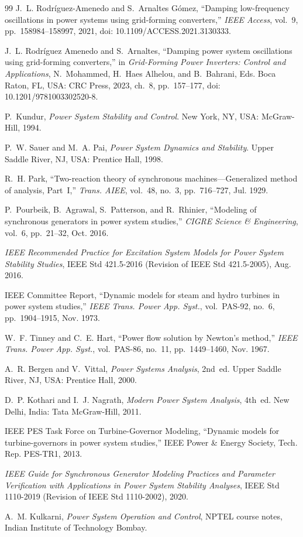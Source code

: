 \documentclass[11pt,a4paper]{article}
\numberwithin{equation}{section}
\begin{document}
\newpage
\begin{thebibliography}{99}
J.~L. Rodr\'iguez-Amenedo and S.~Arnaltes G\'omez, ``Damping low-frequency oscillations in power systems using grid-forming converters,'' \emph{IEEE Access}, vol.~9, pp.~158984--158997, 2021, doi: 10.1109/ACCESS.2021.3130333.

J.~L. Rodr\'iguez Amenedo and S.~Arnaltes, ``Damping power system oscillations using grid-forming converters,'' in \emph{Grid-Forming Power Inverters: Control and Applications}, N.~Mohammed, H.~Haes Alhelou, and B.~Bahrani, Eds. Boca Raton, FL, USA: CRC Press, 2023, ch.~8, pp.~157--177, doi: 10.1201/9781003302520-8.

P.~Kundur, \emph{Power System Stability and Control}. New York, NY, USA: McGraw-Hill, 1994.

P.~W. Sauer and M.~A. Pai, \emph{Power System Dynamics and Stability}. Upper Saddle River, NJ, USA: Prentice Hall, 1998.

R.~H. Park, ``Two-reaction theory of synchronous machines---Generalized method of analysis, Part~I,'' \emph{Trans. AIEE}, vol.~48, no.~3, pp.~716--727, Jul. 1929.

P.~Pourbeik, B.~Agrawal, S.~Patterson, and R.~Rhinier, ``Modeling of synchronous generators in power system studies,'' \emph{CIGRE Science \& Engineering}, vol.~6, pp.~21--32, Oct. 2016.

\emph{IEEE Recommended Practice for Excitation System Models for Power System Stability Studies}, IEEE Std 421.5-2016 (Revision of IEEE Std 421.5-2005), Aug. 2016.

IEEE Committee Report, ``Dynamic models for steam and hydro turbines in power system studies,'' \emph{IEEE Trans. Power App. Syst.}, vol.~PAS-92, no.~6, pp.~1904--1915, Nov. 1973.

W.~F. Tinney and C.~E. Hart, ``Power flow solution by Newton's method,'' \emph{IEEE Trans. Power App. Syst.}, vol.~PAS-86, no.~11, pp.~1449--1460, Nov. 1967.

A.~R. Bergen and V.~Vittal, \emph{Power Systems Analysis}, 2nd~ed. Upper Saddle River, NJ, USA: Prentice Hall, 2000.

D.~P. Kothari and I.~J. Nagrath, \emph{Modern Power System Analysis}, 4th~ed. New Delhi, India: Tata McGraw-Hill, 2011.

IEEE PES Task Force on Turbine-Governor Modeling, ``Dynamic models for turbine-governors in power system studies,'' IEEE Power \& Energy Society, Tech. Rep. PES-TR1, 2013.

\emph{IEEE Guide for Synchronous Generator Modeling Practices and Parameter Verification with Applications in Power System Stability Analyses}, IEEE Std 1110-2019 (Revision of IEEE Std 1110-2002), 2020.

A.~M. Kulkarni, \emph{Power System Operation and Control}, NPTEL course notes, Indian Institute of Technology Bombay.
\end{thebibliography}
\end{document}

